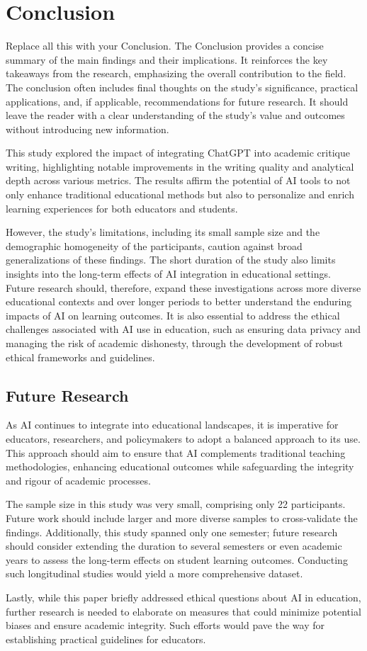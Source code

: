 \section{Conclusion}
\label{Conclusion}

Replace all this with your Conclusion.  The Conclusion provides a concise summary of the main findings and their implications. It reinforces the key takeaways from the research, emphasizing the overall contribution to the field. The conclusion often includes final thoughts on the study’s significance, practical applications, and, if applicable, recommendations for future research. It should leave the reader with a clear understanding of the study’s value and outcomes without introducing new information.

This study explored the impact of integrating ChatGPT into academic critique writing, highlighting notable improvements in the writing quality and analytical depth across various metrics. The results affirm the potential of AI tools to not only enhance traditional educational methods but also to personalize and enrich learning experiences for both educators and students.

However, the study's limitations, including its small sample size and the demographic homogeneity of the participants, caution against broad generalizations of these findings. The short duration of the study also limits insights into the long-term effects of AI integration in educational settings. Future research should, therefore, expand these investigations across more diverse educational contexts and over longer periods to better understand the enduring impacts of AI on learning outcomes. It is also essential to address the ethical challenges associated with AI use in education, such as ensuring data privacy and managing the risk of academic dishonesty, through the development of robust ethical frameworks and guidelines.


\subsection{Future Research}
As AI continues to integrate into educational landscapes, it is imperative for educators, researchers, and policymakers to adopt a balanced approach to its use. This approach should aim to ensure that AI complements traditional teaching methodologies, enhancing educational outcomes while safeguarding the integrity and rigour of academic processes.

The sample size in this study was very small, comprising only 22 participants. Future work should include larger and more diverse samples to cross-validate the findings. Additionally, this study spanned only one semester; future research should consider extending the duration to several semesters or even academic years to assess the long-term effects on student learning outcomes. Conducting such longitudinal studies would yield a more comprehensive dataset.

Lastly, while this paper briefly addressed ethical questions about AI in education, further research is needed to elaborate on measures that could minimize potential biases and ensure academic integrity. Such efforts would pave the way for establishing practical guidelines for educators.